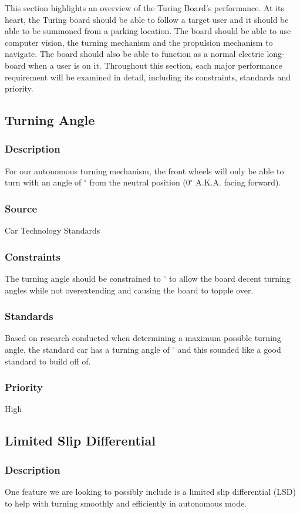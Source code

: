 This section highlights an overview of the Turing Board's performance. At its heart, the Turing board should be able to follow a target user and it should be able to be summoned from a parking location. The board should be able to use computer vision, the turning mechanism and the propulsion mechanism to navigate. The board should also be able to function as a normal electric long-board when a user is on it. Throughout this section, each major performance requirement will be examined in detail, including its constraints, standards and priority.

\subsection{Turning Angle}
\subsubsection{Description}
For our autonomous turning mechanism, the front wheels will only be able to turn with an angle of $^{\circ}$ from the neutral position (0$^{\circ}$ A.K.A. facing forward).
\subsubsection{Source}
Car Technology Standards
\subsubsection{Constraints}
The turning angle should be constrained to $^{\circ}$ to allow the board decent turning angles while not overextending and causing the board to topple over.
\subsubsection{Standards}
Based on research conducted when determining a maximum possible turning angle, the standard car has a turning angle of $^{\circ}$ and this sounded like a good standard to build off of.
\subsubsection{Priority}
High

\subsection{Limited Slip Differential}
\subsubsection{Description}
One feature we are looking to possibly include is a limited slip differential (LSD) to help with turning smoothly and efficiently in autonomous mode.
